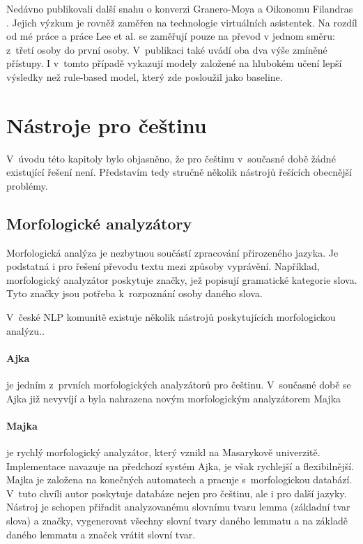 Nedávno publikovali další snahu o konverzi Granero-Moya a Oikonomu Filandras \cite{granero-moya-oikonomou-filandras-2021-taking}. Jejich výzkum je rovněž zaměřen na technologie virtuálních asistentek. Na rozdíl od mé práce a práce Lee et al. se zaměřují pouze na převod v jednom směru: z~třetí osoby do první osoby. V~publikaci také uvádí oba dva výše zmíněné přístupy. I v~tomto případě vykazují modely založené na hlubokém učení lepší výsledky než rule-based model, který zde posloužil jako baseline.


\section{Nástroje pro češtinu}

V~úvodu této kapitoly bylo objasněno, že pro češtinu v~současné době žádné existující řešení není. Představím tedy stručně několik nástrojů řešících obecnější problémy.

\subsection{Morfologické analyzátory}

Morfologická analýza je nezbytnou součástí zpracování přirozeného jazyka. Je podstatná i pro řešení převodu textu mezi způsoby vyprávění. Například, morfologický analyzátor poskytuje značky, jež popisují gramatické kategorie slova. Tyto značky jsou potřeba k~rozpoznání osoby daného slova.

V~české NLP komunitě existuje několik nástrojů poskytujících morfologickou analýzu..

\paragraph{Ajka}

je jedním z~prvních morfologických analyzátorů pro češtinu. V~současné době se Ajka již nevyvíjí a byla nahrazena novým morfologickým analyzátorem Majka \cite{Sedlacekthesis}

\paragraph{Majka}

je rychlý morfologický analyzátor, který vznikl na Masarykově univerzitě. Implementace navazuje na předchozí systém Ajka, je však rychlejší a flexibilnější. Majka je založena na konečných automatech a pracuje s~morfologickou databází. V~tuto chvíli autor poskytuje databáze nejen pro češtinu, ale i pro další jazyky. Nástroj je schopen přiřadit analyzovanému slovnímu tvaru lemma (základní tvar slova) a značky, vygenerovat všechny slovní tvary daného lemmatu a na základě daného lemmatu a značek vrátit slovní tvar.\cite{majka}

